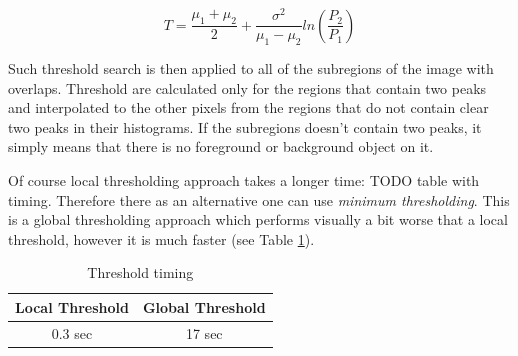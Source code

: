 \begin{equation}
    T = \frac{\mu_1 + \mu_2}{2} + \frac{\sigma^2}{\mu_1 - \mu_2}ln\left(\frac{P_2}{P_1}\right)
\end{equation}

Such threshold search is then applied to all of the subregions of the image with overlaps. Threshold are calculated only for the regions that contain two peaks and interpolated to the other pixels from the regions that do not contain clear two peaks in their histograms. If the subregions doesn't contain two peaks, it simply means that there is no foreground or background object on it. 

Of course local thresholding approach takes a longer time:
TODO table with timing. Therefore there as an alternative one can use \textit{minimum thresholding}. This is a global thresholding approach which performs visually a bit worse that a local threshold, however it is much faster (see Table \ref{tab:threshold-timing}).

\begin{table}
\centering
    \begin{tabular}{||c c||} 
     \hline
     Local Threshold & Global Threshold \\ [0.5ex] 
     \hline\hline
     0.3 sec & 17 sec  \\ 
     \hline
    \end{tabular}
    \caption{Threshold timing}
    \label{tab:threshold-timing}
\end{table}


